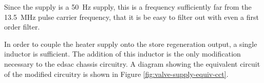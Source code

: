 Since the supply is a \SI{50}{\hertz} supply, this is a frequency sufficiently far from the \SI{13.5}{\mega\hertz} pulse carrier frequency, that it is be easy to filter out with even a first order filter.

In order to couple the heater supply onto the store regeneration output, a single inductor is sufficient. The addition of this inductor is the only modification necessary to the \gls{edsac} chassis circuitry. A diagram showing the equivalent circuit of the modified circuitry is shown in Figure \ref{fig:valve-supply-equiv-cct}.

\begin{figure}[ht]
	\centering
\end{figure}
